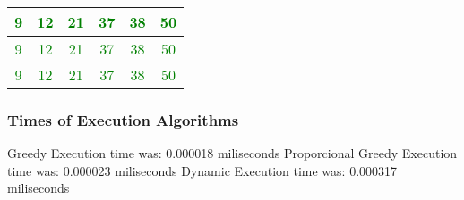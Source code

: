 \documentclass[12]{beamer}
\begin{document}
\begin{frame}
\begin{center}
\begin{adjustbox}{max width=\textwidth}
\begin{tabular}{ |c|c|c|c|c|c|}
\hline
 \textcolor{green}{9} & \textcolor{green}{12} & \textcolor{green}{21} & \textcolor{green}{37} & \textcolor{green}{38} & \textcolor{green}{50}\\ 
\hline
 \textcolor{green}{9} & \textcolor{green}{12} & \textcolor{green}{21} & \textcolor{green}{37} & \textcolor{green}{38} & \textcolor{green}{50}\\ 
\hline
 \textcolor{green}{9} & \textcolor{green}{12} & \textcolor{green}{21} & \textcolor{green}{37} & \textcolor{green}{38} & \textcolor{green}{50}\\ 
\hline
\end{tabular}
\end{adjustbox}
\end{center}

\end{frame}
\begin{frame}
\frametitle{Times of Execution Algorithms}

\begin{center}
Greedy Execution time was:  0.000018 miliseconds 
\newline
Proporcional Greedy Execution time was:  0.000023    miliseconds
Dynamic Execution time was:  0.000317  miliseconds 
\end{center}

\end{frame}
\end{document}
